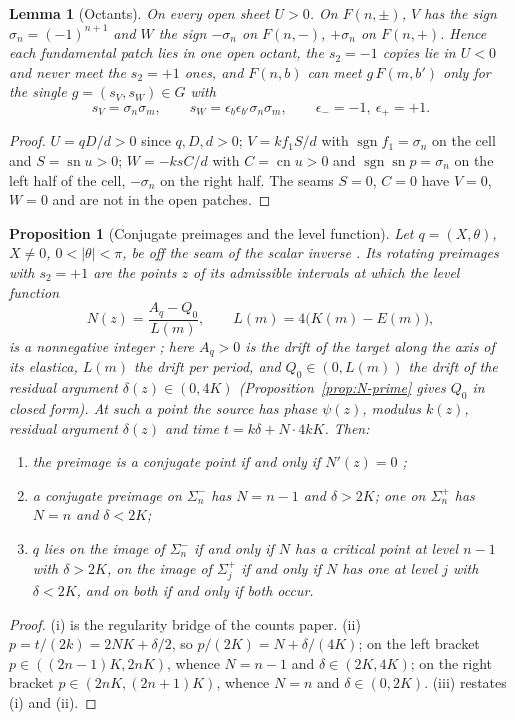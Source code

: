 \documentclass[11pt]{article}
\newtheorem{lemma}[theorem]{Lemma}
\newtheorem{proposition}[theorem]{Proposition}
\theoremstyle{remark}
\newcommand{\sn}{\operatorname{sn}}
\newcommand{\cn}{\operatorname{cn}}
\begin{document}
\begin{lemma}[Octants]\label{lem:octants}
On every open sheet $U>0$.  On $F(n,\pm)$, $V$ has the sign
$\sigma_n=(-1)^{n+1}$ and $W$ the sign $-\sigma_n$ on $F(n,-)$, $+\sigma_n$
on $F(n,+)$.  Hence each fundamental patch lies in one open octant, the
$s_2=-1$ copies lie in $U<0$ and never meet the $s_2=+1$ ones, and
$F(n,b)$ can meet $g\,F(m,b')$ only for the single $g=(s_V,s_W)\in G$ with
\[
 s_V=\sigma_n\sigma_m,\qquad s_W=\epsilon_b\epsilon_{b'}\sigma_n\sigma_m,
 \qquad \epsilon_-=-1,\ \epsilon_+=+1 .
\]
\end{lemma}
\begin{proof}
$U=qD/d>0$ since $q,D,d>0$; $V=kf_1S/d$ with $\operatorname{sgn}f_1=\sigma_n$
on the cell and $S=\sn u>0$; $W=-ksC/d$ with $C=\cn u>0$ and
$\operatorname{sgn}\sn p=\sigma_n$ on the left half of the cell, $-\sigma_n$
on the right half.  The seams $S=0$, $C=0$ have $V=0$, $W=0$ and are not in
the open patches.
\end{proof}

\begin{proposition}[Conjugate preimages and the level function]\label{prop:level}
Let $q=(X,\theta)$, $X\ne0$, $0<|\theta|<\pi$, be off the seam of the
scalar inverse \cite[Proposition 2.1]{SE2Counts}.  Its rotating preimages
with $s_2=+1$ are the points $z$ of its admissible intervals at which the
level function
\begin{equation}\label{eq:level-function}
 N(z)=\frac{A_q-Q_0}{L(m)},\qquad L(m)=4\bigl(K(m)-E(m)\bigr),
\end{equation}
is a nonnegative integer \cite{SE2Counts}; here $A_q>0$ is the drift of
the target along the axis of its elastica, $L(m)$ the drift per period,
and $Q_0\in(0,L(m))$ the drift of the residual argument
$\delta(z)\in(0,4K)$ (Proposition~\ref{prop:N-prime} gives $Q_0$ in closed
form).  At such a point the source has phase $\psi(z)$, modulus $k(z)$,
residual argument $\delta(z)$ and time $t=k\delta+N\cdot4kK$.  Then:
\begin{enumerate}[nosep,leftmargin=*]
\item[(i)] the preimage is a conjugate point if and only if $N'(z)=0$
      \cite[Proposition 2.2]{SE2Counts};
\item[(ii)] a conjugate preimage on $\Sigma_n^-$ has $N=n-1$ and
      $\delta>2K$; one on $\Sigma_n^+$ has $N=n$ and $\delta<2K$;
\item[(iii)] $q$ lies on the image of $\Sigma_n^-$ if and only if $N$ has a
      critical point at level $n-1$ with $\delta>2K$, on the image of
      $\Sigma_j^+$ if and only if $N$ has one at level $j$ with $\delta<2K$,
      and on both if and only if both occur.
\end{enumerate}
\end{proposition}
\begin{proof}
(i) is the regularity bridge of the counts paper.  (ii) $p=t/(2k)=2NK+\delta/2$,
so $p/(2K)=N+\delta/(4K)$; on the left bracket $p\in((2n-1)K,2nK)$, whence
$N=n-1$ and $\delta\in(2K,4K)$; on the right bracket $p\in(2nK,(2n+1)K)$,
whence $N=n$ and $\delta\in(0,2K)$.  (iii) restates (i) and (ii).
\end{proof}
\end{document}
